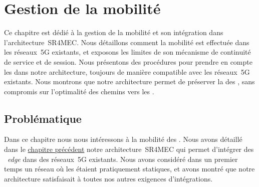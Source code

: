 \documentclass[../main.tex]{subfiles}
\begin{document}
\initSubfile[4]
\chapter{Gestion de la mobilité}
\label{ch:mobility}

\begin{chapterHeader}
Ce chapitre est dédié à la gestion de la mobilité et son intégration dans l’architecture~SR4MEC.
Nous détaillons comment la mobilité est effectuée dans les réseaux~5G existants, et exposons les limites de son mécanisme de continuité de service et de session.
Nous présentons des procédures pour prendre en compte les  dans notre architecture, toujours de manière compatible avec les réseaux~5G existants.
Nous montrons que notre architecture permet de préserver la  des , sans compromis sur l’optimalité des chemins vers les .
\end{chapterHeader}

\section{Problématique}
Dans ce chapitre nous nous intéressons à la mobilité des .
Nous avons détaillé dans le \hyperref[ch:edge-services-integration]{chapitre précédent} notre architecture~SR4MEC qui permet d’intégrer des ~\textit{edge} dans des réseaux~5G existants.
Nous avons considéré dans un premier temps un réseau où les  étaient pratiquement statiques, et avons montré que notre architecture satisfaisait à toutes nos autres exigences d’intégrations.
\end{document}
